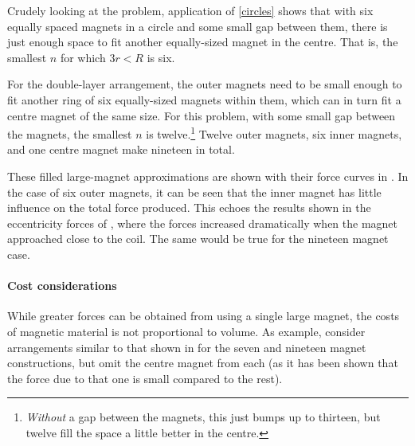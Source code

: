 Crudely looking at the problem, application of \eqref{circles} shows
that with six equally spaced magnets in a circle and some small gap
between them, there is just enough space to fit another equally-sized
magnet in the centre. That is, the smallest $n$ for which $3r<R$ is six.

For the double-layer arrangement, the outer magnets need to be small
enough to fit another ring of six equally-sized magnets within them,
which can in turn fit a centre magnet of the same size. For this
problem, with some small gap between the magnets, the smallest $n$ is
twelve.\footnote{\emph{Without} a gap between the magnets, this just
  bumps up to thirteen, but twelve fill the space a little better in
  the centre.} Twelve outer magnets, six inner magnets, and one centre
magnet make nineteen in total.

These filled large-magnet approximations are shown with their force
curves in . In the case of six outer magnets, it
can be seen that the inner magnet has little influence on the total
force produced. This echoes the results shown in the eccentricity
forces of , where the forces increased dramatically
when the magnet approached close to the coil. The same would be true
for the nineteen magnet case.

\begin{figure}
  \begin{subfigure}
  \end{subfigure}\par
  \begin{subfigure}
  \end{subfigure}
\end{figure}

\paragraph{Cost considerations}

While greater forces can be obtained from using a single large magnet,
the costs of magnetic material is not proportional to volume. As
example, consider arrangements similar to that shown in
 for the seven and nineteen magnet constructions,
but omit the centre magnet from each (as it has been shown that the
force due to that one is small compared to the rest).

